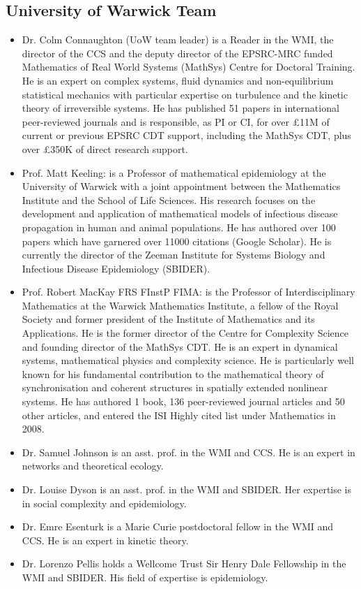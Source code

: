 \subsection{University of Warwick Team}
\begin{itemize}
\itemsep\myitemsep
\item
{\hvnb Dr. Colm Connaughton (UoW team leader)}  is a Reader in the WMI, 
the director of the CCS and the deputy director of the EPSRC-MRC funded Mathematics of Real 
World Systems (MathSys) Centre for Doctoral Training. He is an expert on 
complex systems, fluid dynamics and non-equilibrium statistical mechanics with 
particular expertise on turbulence and the kinetic theory of irreversible 
systems. He has published 51 papers in international peer-reviewed journals and 
is responsible, as PI or CI, for over \pounds 11M of current or previous EPSRC 
CDT support, including the MathSys CDT, plus over \pounds 350K of direct 
research support. 
\item {\hvnb Prof. Matt Keeling:} is a Professor of mathematical epidemiology 
at the University of Warwick with a joint appointment between the Mathematics 
Institute and the School of Life Sciences. His research focuses on the 
development and application of mathematical models of infectious disease 
propagation in human and animal populations.  He has authored over 100 papers 
which have garnered over 11000 citations (Google Scholar). He is currently the 
director of the Zeeman Institute for Systems Biology and Infectious Disease 
Epidemiology (SBIDER).
\item {\hvnb Prof. Robert MacKay FRS FInstP FIMA:} is the Professor of 
Interdisciplinary Mathematics at the Warwick Mathematics Institute, a fellow of 
the Royal Society and former president of the Institute of Mathematics and its 
Applications. He is the former director of the Centre for Complexity Science 
and founding director of the MathSys CDT. He is an expert in dynamical systems, 
mathematical physics and complexity science. He is particularly well known for 
his fundamental contribution to the mathematical theory of synchronisation and 
coherent structures in spatially extended nonlinear systems.   He has authored 
1 book, 136 peer-reviewed journal articles and 50 other articles, and entered 
the ISI Highly cited list under Mathematics in 2008.
\item{\hvnb Dr. Samuel Johnson} is an asst. prof. in the WMI and CCS.  
He is an expert in networks and theoretical ecology.
\item{\hvnb Dr. Louise Dyson} is an asst. prof. in the WMI and SBIDER.  
Her expertise is in social complexity and epidemiology.
\item{\hvnb Dr. Emre Esenturk} is a Marie Curie postdoctoral fellow in the WMI 
and CCS. He is an expert in kinetic theory.
\item{\hvnb Dr. Lorenzo Pellis} holds a Wellcome Trust Sir Henry Dale Fellowship in the WMI 
and SBIDER. His field of expertise is epidemiology.
\end{itemize}

